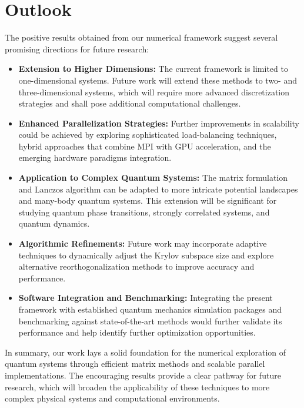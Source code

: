 \documentclass[12pt,a4paper]{report}
\begin{document}
\section*{Outlook}

The positive results obtained from our numerical framework suggest several promising directions for future research:
\begin{itemize}
    \item \textbf{Extension to Higher Dimensions:} The current framework is limited to one-dimensional systems. Future work will extend these methods to two- and three-dimensional systems, which will require more advanced discretization strategies and shall pose additional computational challenges.
    
    \item \textbf{Enhanced Parallelization Strategies:} Further improvements in scalability could be achieved by exploring sophisticated load-balancing techniques, hybrid approaches that combine MPI with GPU acceleration, and the emerging hardware paradigms integration.
    
    \item \textbf{Application to Complex Quantum Systems:} The matrix formulation and Lanczos algorithm can be adapted to more intricate potential landscapes and many-body quantum systems. This extension will be significant for studying quantum phase transitions, strongly correlated systems, and quantum dynamics.
    
    \item \textbf{Algorithmic Refinements:} Future work may incorporate adaptive techniques to dynamically adjust the Krylov subspace size and explore alternative reorthogonalization methods to improve accuracy and performance.
    
    \item \textbf{Software Integration and Benchmarking:} Integrating the present framework with established quantum mechanics simulation packages and benchmarking against state-of-the-art methods would further validate its performance and help identify further optimization opportunities.
\end{itemize}

In summary, our work lays a solid foundation for the numerical exploration of quantum systems through efficient matrix methods and scalable parallel implementations. The encouraging results provide a clear pathway for future research, which will broaden the applicability of these techniques to more complex physical systems and computational environments.
\end{document}
